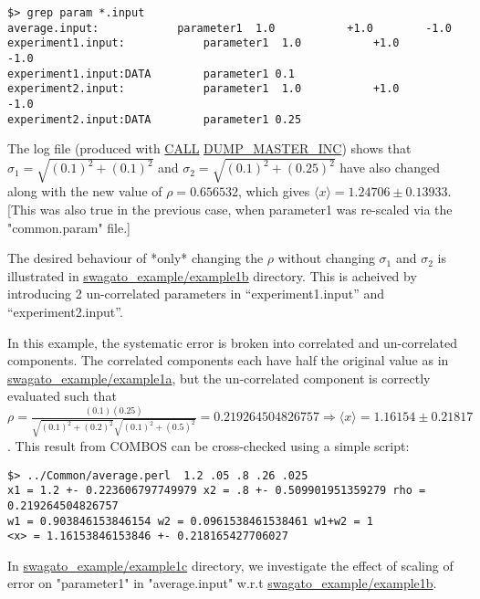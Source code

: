 \documentclass[12pt,a4paper,dvips]{article}
\begin{document}
\vspace*{-.5cm}
\begin{verbatim}
$> grep param *.input 
average.input:            parameter1  1.0           +1.0        -1.0
experiment1.input:            parameter1  1.0           +1.0        -1.0
experiment1.input:DATA        parameter1 0.1
experiment2.input:            parameter1  1.0           +1.0        -1.0
experiment2.input:DATA        parameter1 0.25
\end{verbatim}

\vspace*{-.5cm}
The log file (produced with \url{CALL} \url{DUMP_MASTER_INC}) shows that $\sigma_1 = \sqrt{(0.1)^2+(0.1)^2}$
and $\sigma_2 = \sqrt{(0.1)^2+(0.25)^2}$ have also changed along with the new value of $\rho = 0.656532$,
which gives $\langle x \rangle = 1.24706 \pm 0.13933$. [This was also true in the previous case,
when parameter1 was re-scaled via the "common.param" file.]


The desired behaviour of *only* changing the $\rho$ without changing $\sigma_1$ and $\sigma_2$ is illustrated
in \url{swagato_example/example1b} directory. 
This is acheived by introducing 2 un-correlated parameters in ``experiment1.input'' and ``experiment2.input''.

In this example, the systematic error is broken into correlated and un-correlated components.
The correlated components each have half the original value as in \url{swagato_example/example1a}, 
but the un-correlated component is correctly evaluated
such that $\rho = \frac{(0.1)(0.25)}{\sqrt{(0.1)^2+(0.2)^2}\sqrt{(0.1)^2+(0.5)^2}} = 0.219264504826757 \Rightarrow
\langle x \rangle = 1.16154 \pm 0.21817$. This result from COMBOS can be cross-checked using a simple script:

\vspace*{-.5cm}
\begin{verbatim}
$> ../Common/average.perl  1.2 .05 .8 .26 .025
x1 = 1.2 +- 0.223606797749979 x2 = .8 +- 0.509901951359279 rho = 0.219264504826757
w1 = 0.903846153846154 w2 = 0.0961538461538461 w1+w2 = 1
<x> = 1.16153846153846 +- 0.218165427706027
\end{verbatim}

\vspace*{-.5cm}
In \url{swagato_example/example1c} directory,
we investigate the effect of scaling of error on "parameter1" in "average.input" w.r.t \url{swagato_example/example1b}.
\end{document}
